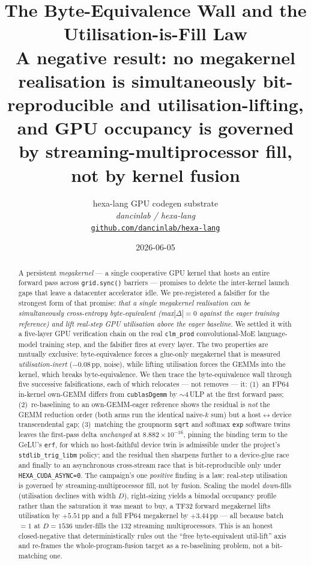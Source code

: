 \documentclass[11pt,a4paper]{article}
\title{
  \textbf{The Byte-Equivalence Wall and the Utilisation-is-Fill Law}\\[4pt]
  \large A negative result: no megakernel realisation is simultaneously
  bit-reproducible and utilisation-lifting, and GPU occupancy is governed
  by streaming-multiprocessor fill, not by kernel fusion
}
\author{
  hexa-lang GPU codegen substrate\\
  \normalsize\textit{dancinlab / hexa-lang}\\[2pt]
  \normalsize\href{https://github.com/dancinlab/hexa-lang}{\texttt{github.com/dancinlab/hexa-lang}}
}
\date{2026-06-05}
\begin{document}
\maketitle

\begin{abstract}
A persistent \emph{megakernel} --- a single cooperative GPU kernel that
hosts an entire forward pass across \texttt{grid.sync()} barriers ---
promises to delete the inter-kernel launch gaps that leave a datacenter
accelerator idle. We pre-registered a falsifier for the strongest form of
that promise: \emph{that a single megakernel realisation can be
simultaneously cross-entropy byte-equivalent (max$|\Delta|=0$ against the
eager training reference) and lift real-step GPU utilisation above the
eager baseline}. We settled it with a five-layer GPU verification chain on
the real \texttt{clm\_prod} convolutional-MoE language-model training step,
and the falsifier fires at every layer. The two properties are mutually
exclusive: byte-equivalence forces a glue-only megakernel that is measured
\emph{utilisation-inert} ($-0.08$\,pp, noise), while lifting utilisation
forces the GEMMs into the kernel, which breaks byte-equivalence. We then
trace the byte-equivalence wall through five successive falsifications,
each of which relocates --- not removes --- it: (1)~an FP64 in-kernel
own-GEMM differs from \texttt{cublasDgemm} by ${\sim}4$\,ULP at the first
forward pass; (2)~re-baselining to an own-GEMM-eager reference shows the
residual is \emph{not} the GEMM reduction order (both arms run the
identical naive-$k$ sum) but a host$\leftrightarrow$device transcendental
gap; (3)~matching the groupnorm \texttt{sqrt} and softmax \texttt{exp}
software twins leaves the first-pass delta \emph{unchanged} at
$8.882\times10^{-16}$, pinning the binding term to the GeLU's
\texttt{erf}, for which no host-faithful device twin is admissible under
the project's \texttt{stdlib\_trig\_libm} policy; and the residual then
sharpens further to a device-glue race and finally to an asynchronous
cross-stream race that is bit-reproducible only under
\texttt{HEXA\_CUDA\_ASYNC=0}. The campaign's one \emph{positive} finding is
a law: real-step utilisation is governed by streaming-multiprocessor fill,
not by fusion. Scaling the model \emph{down}-fills (utilisation declines
with width $D$), right-sizing yields a bimodal occupancy profile rather
than the saturation it was meant to buy, a TF32 forward megakernel lifts
utilisation by $+5.51$\,pp and a full FP64 megakernel by $+3.44$\,pp ---
all because batch~$=1$ at $D{=}1536$ under-fills the $132$ streaming
multiprocessors. This is an honest closed-negative that deterministically
rules out the ``free byte-equivalent util-lift'' axis and re-frames the
whole-program-fusion target as a re-baselining problem, not a bit-matching
one.
\end{abstract}
\end{document}
